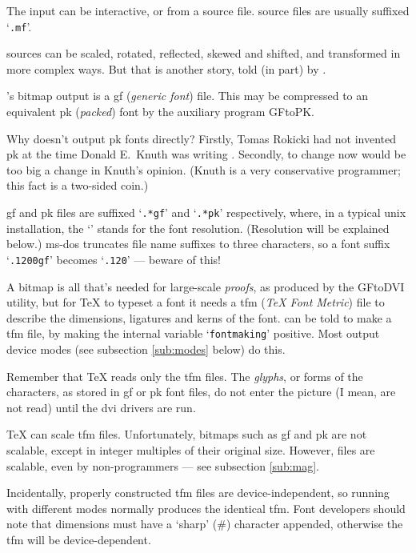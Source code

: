The input can be interactive, or from a source file.
\MF{} source files are usually suffixed `{\tt .mf}'.

\MF{} sources can be scaled, rotated, reflected, skewed and shifted,
and transformed in more complex ways.
But that is another story, told (in part) by \MFbook{}.

\MF{}'s bitmap output is a {\sc gf} ({\em generic font}) file.
This may be compressed to an equivalent {\sc pk} ({\em packed}) font
by the auxiliary program {\sf GFtoPK}.

Why doesn't \MF{} output {\sc pk} fonts directly?  Firstly, Tomas
{\sc Rokicki} had not invented {\sc pk} at the time Donald
E.~{\sc Knuth} was writing \MF{}.  Secondly, to change \MF{} now
would be too big a change in {\sc Knuth}'s opinion.  ({\sc Knuth}
is a very conservative programmer; this fact is a two-sided coin.)

{\sc gf} and {\sc pk} files are suffixed `{\tt .*gf}' and `{\tt .*pk}'
respectively, where, in a typical {\sc unix} installation, the
`{\tt *}' stands for the font resolution.
(Resolution will be explained below.)
{\sc ms-dos} truncates file name suffixes to three characters, so a
font suffix `{\tt .1200gf}' becomes `{\tt .120}' --- beware of this!

A bitmap is all that's needed for large-scale {\em proofs\/},
as produced by the {\sf GFtoDVI} utility,
but for \TeX{} to typeset a font it needs a {\sc tfm}
({\em \TeX{} Font Metric}) file to describe the dimensions, ligatures
and kerns of the font.  \MF{} can be told to make a {\sc tfm} file,
by making the internal variable `{\tt fontmaking}' positive.  Most
output device modes (see subsection \ref{sub:modes} below) do this.

Remember that \TeX{} reads only the {\sc tfm} files.
The {\em glyphs}, or forms of the characters, as stored in {\sc gf}
or {\sc pk} font files, do not enter the picture
(I mean, are not read)
until the {\sc dvi} drivers are run.

\TeX{} can scale {\sc tfm} files.  Unfortunately, bitmaps such as
{\sc gf} and {\sc pk} are not scalable, except in integer multiples
of their original size.  However, \MF{} files are scalable, even
by non-programmers --- see subsection \ref{sub:mag}.

Incidentally, properly constructed {\sc tfm} files are
device-independent, so running \MF{} with different modes normally
produces the identical {\sc tfm}.  Font developers should note that
dimensions must have a `sharp' (\#) character appended, otherwise the
{\sc tfm} will be device-dependent.

